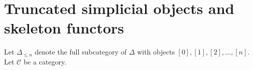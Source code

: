 \section{Truncated simplicial objects and skeleton functors}
\label{section-skeleton}

\noindent
Let $\Delta_{\leq n}$ denote the full subcategory of
$\Delta$ with objects $[0], [1], [2], \ldots, [n]$.
Let $\mathcal{C}$ be a category.

